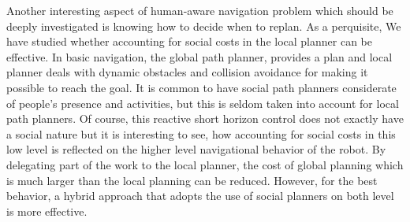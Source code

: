 Another interesting aspect of human-aware navigation problem which should be deeply investigated is knowing how to decide when to replan. As a perquisite, We have studied whether accounting for social costs in the local planner can be effective. In basic navigation, the global path planner, provides a plan and local planner deals with dynamic obstacles and collision avoidance for making it possible to reach the goal. It is common to have social path planners considerate of people's presence and activities, but this is seldom taken into account for local path planners. Of course, this reactive short horizon control does not exactly have a social nature but it is interesting to see, how accounting for social costs in this low level is reflected on the higher level navigational behavior of the robot. By delegating part of the work to the local planner, the cost of global planning which is much larger than the local planning can be reduced. However, for the best behavior, a hybrid approach that adopts the use of social planners on both level is more effective.    

